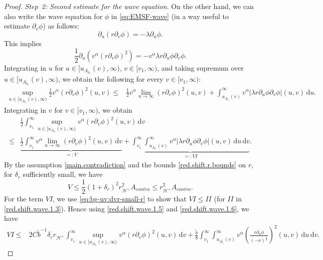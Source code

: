 \documentclass[10pt, reqno]{amsart}
\theoremstyle{definition}
\theoremstyle{remark}
\theoremstyle{conjecture}
\numberwithin{equation}{section}
\newcommand{\ud}{\mathrm{d}}
\newcommand{\rd}{\partial}
\newcommand{\0}{\emptyset}
\newcommand{\alp}{\alpha}
\newcommand{\calH}{\mathcal H}
\newcommand{\f}{\frac}
\newcommand{\de}{\delta}
\newcommand{\EH}{\calH^{+}}
\newcommand{\pfstep}[1]{\vspace{.5em} {\it \noindent #1.}}
\begin{document}
\begin{proof}
\pfstep{Step~2: Second estimate for the wave equation}
On the other hand, we can also write the wave equation for $\phi$ in \eqref{eq:EMSF-wave} (in a way useful to estimate $\rd_v\phi$) as follows:
$$\rd_u(r\rd_v\phi)=-\lambda \rd_u\phi.$$
This implies
\begin{equation}\label{red.shift.wave.2}
\f 12\rd_u \left(v^{\alp}(r\rd_v\phi)^2\right)=-v^{\alp}\lambda r\rd_u\phi\rd_v\phi.
\end{equation}
Integrating in $u$ for $u\in [u_{\Lambda_{\de_r}}(v),\infty)$, $v\in [v_1,\infty)$, and taking supremum over $u\in [u_{\Lambda_{\de_r}}(v),\infty)$, we obtain the following for every $v\in [v_1,\infty)$:
\begin{equation}\label{red.shift.wave.2.1}
\begin{split}
\sup_{u\in [u_{\Lambda_{\de_r}}(v),\infty)}\f 12 v^{\alp}(r\rd_v\phi)^2(u,v)
\leq & \f 12 v^{\alp}\lim_{u\to \infty}(r\rd_v\phi)^2(u,v)+\int_{u_{\Lambda_{\de_r}}(v)}^\infty v^{\alp}\left|\lambda r\rd_u\phi\rd_v\phi\right|(u,v) \, \ud u.
\end{split}
\end{equation}
Integrating in $v$ for $v\in [v_1,\infty)$, we obtain
\begin{equation}\label{red.shift.wave.2.2}
\begin{split}
&\f 12\int_{v_1}^\infty \sup_{u\in [u_{\Lambda_{\de_r}}(v),\infty)} v^{\alp}(r\rd_v\phi)^2(u,v)\, \ud v\\
\leq & \underbrace{\f 12\int_{v_1}^\infty  v^{\alp}\lim_{u\to \infty}(r\rd_v\phi)^2(u,v)\, \ud v}_{=:V}+\underbrace{\int_{v_1}^\infty\int_{u_{\Lambda_{\de_r}}(v)}^\infty v^{\alp}\left|\lambda r\rd_u\phi\rd_v\phi\right|(u,v) \, \ud u\, \ud v}_{=:VI}.
\end{split}
\end{equation}
By the assumption \eqref{main.contradiction} and the bounds \eqref{red.shift.r.bounds} on $r$, for ${\de_r}$ sufficiently small, we have
\begin{equation}\label{red.shift.wave.2.3}
V\leq \f 12 (1+{\de_r})^2 r_{\EH}^2 A_{contra}\leq r_{\EH}^2 A_{contra}.
\end{equation}
For the term $VI$, we use \eqref{eq:bg-uv:dvr-small-r} to show that $VI\leq II$ (for $II$ in \eqref{red.shift.wave.1.3}). Hence using \eqref{red.shift.wave.1.5} and \eqref{red.shift.wave.1.6}, we have
\begin{equation}\label{red.shift.wave.2.4}
\begin{split}
VI\leq & 2C \tilde{b}^{-1}{\de_r} r_{\EH} \int_{v_1}^\infty \sup_{u\in [u_{\Lambda_{\de_r}}(v),\infty)} v^{\alp}(r\rd_v\phi)^2(u,v)\, \ud v+ \f{\tilde{b}}{8} \int_{v_1}^\infty\int_{u_{\Lambda_{\de_r}}(v)}^\infty v^{\alp} \left(\f{r\rd_u\phi}{(-\nu)^{\f 12}}\right)^2(u,v) \, \ud u\, \ud v.

\end{split}
\end{equation}
\end{proof}
\end{document}
